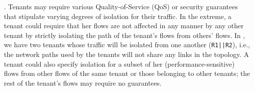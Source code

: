 
. Tenants may require various
  Quality-of-Service (QoS) or security guarantees that stipulate
  varying degrees of isolation for their traffic. In the extreme, a
  tenant could require that her flows are not affected in any manner
  by any other tenant by strictly isolating the path of the tenant's
  flows from others' flows. In , we have two
  tenants whose traffic will be isolated from one another 
  (\texttt{R1||R2}), i.e., the
  network paths used by the tenants will not share any links in the
  topology.  A tenant could also specify isolation for a subset of her
  (performance-sensitive) flows from other flows of the same tenant or
  those belonging to other tenants; the rest of the tenant's flows may
  require no guarantees.

 

